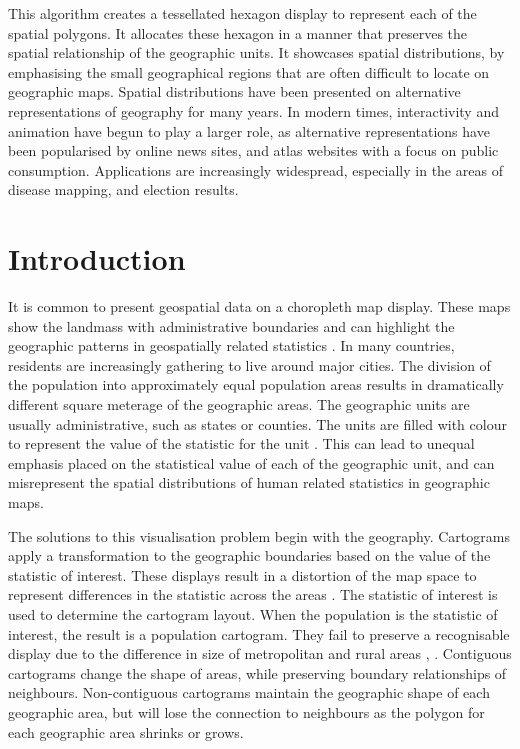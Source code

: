 \documentclass{monashthesis}
\begin{document}
This algorithm creates a tessellated hexagon display to represent each of the spatial polygons. It allocates these hexagon in a manner that preserves the spatial relationship of the geographic units. It showcases spatial distributions, by emphasising the small geographical regions that are often difficult to locate on geographic maps. Spatial distributions have been presented on alternative representations of geography for many years. In modern times, interactivity and animation have begun to play a larger role, as alternative representations have been popularised by online news sites, and atlas websites with a focus on public consumption. Applications are increasingly widespread, especially in the areas of disease mapping, and election results.

\hypertarget{intro3}{%
\section{Introduction}\label{intro3}}

It is common to present geospatial data on a choropleth map display. These maps show the landmass with administrative boundaries and can highlight the geographic patterns in geospatially related statistics \autocite{SAMGIS}.
In many countries, residents are increasingly gathering to live around major cities.
The division of the population into approximately equal population areas results in dramatically different square meterage of the geographic areas. The geographic units are usually administrative, such as states or counties. The units are filled with colour to represent the value of the statistic for the unit \autocite{EI}.
This can lead to unequal emphasis placed on the statistical value of each of the geographic unit, and can misrepresent the spatial distributions of human related statistics in geographic maps.

The solutions to this visualisation problem begin with the geography. Cartograms apply a transformation to the geographic boundaries based on the value of the statistic of interest. These displays result in a distortion of the map space to represent differences in the statistic across the areas \autocite{ACCAC}.
The statistic of interest is used to determine the cartogram layout. When the
population is the statistic of interest, the result is a population cartogram. They fail to preserve a recognisable display due to the difference in size of metropolitan and rural areas \autocite{ACTUC}, \autocite{GOINO}.
Contiguous cartograms change the shape of areas, while preserving boundary relationships of neighbours. Non-contiguous cartograms maintain the geographic shape of each geographic area, but will lose the connection to neighbours as the polygon for each geographic area shrinks or grows.
\end{document}
